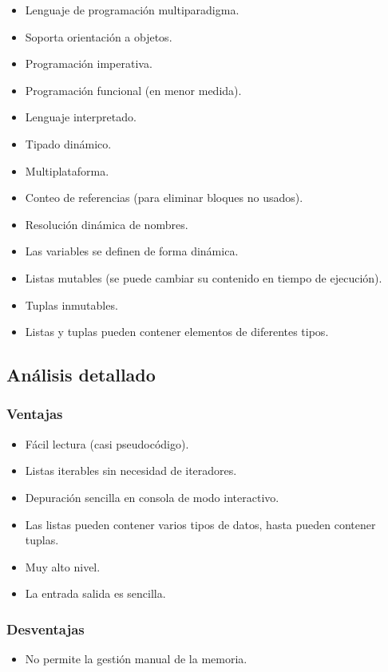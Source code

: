 \documentclass[12pt,a4paper]{article}
\begin{document}
\begin{itemize}
\item Lenguaje de programación multiparadigma.
\item Soporta orientación a objetos.
\item Programación imperativa.
\item Programación funcional (en menor medida).
\item Lenguaje interpretado.
\item Tipado dinámico.
\item Multiplataforma.
\item Conteo de referencias (para eliminar bloques no usados).
\item Resolución dinámica de nombres.
\item Las variables se definen de forma dinámica.
\item Listas mutables (se puede cambiar su contenido en tiempo de ejecución).
\item Tuplas inmutables.
\item Listas y tuplas pueden contener elementos de diferentes tipos.
\end{itemize}


\subsection{Análisis detallado}

\subsubsection{Ventajas}
\begin{itemize}
\item Fácil lectura (casi pseudocódigo).
\item Listas iterables sin necesidad de iteradores.
\item Depuración sencilla en consola de modo interactivo.
\item Las listas pueden contener varios tipos de datos, hasta pueden contener 
tuplas.
\item Muy alto nivel.
\item La entrada salida es sencilla.
\end{itemize}

\subsubsection{Desventajas}
\begin{itemize}
\item No permite la gestión manual de la memoria.
\end{itemize}
  
\end{document}
